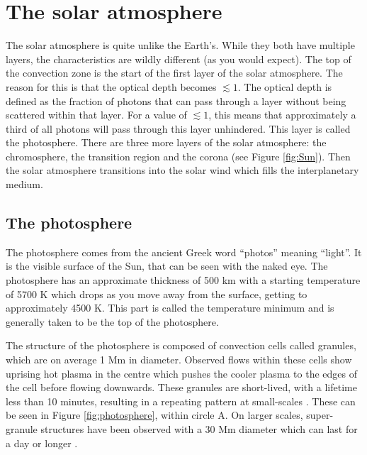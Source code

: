 \section{The solar atmosphere}
 
    The solar atmosphere is quite unlike the Earth's.
    While they both have multiple layers, the characteristics are wildly different (as you would expect). 
    The top of the convection zone is the start of the first layer of the solar atmosphere.
    The reason for this is that the optical depth becomes $\lesssim1$.
    The optical depth is defined as the fraction of photons that can pass through a layer without being scattered within that layer.
    For a value of $\lesssim1$, this means that approximately a third of all photons will pass through this layer unhindered.
    This layer is called the photosphere.
    There are three more layers of the solar atmosphere: the chromosphere, the transition region and the corona (see Figure \ref{fig:Sun}).
    Then the solar atmosphere transitions into the solar wind which fills the interplanetary medium.
    
\subsection{The photosphere}

    The photosphere comes from the ancient Greek word ``photos'' meaning ``light''.
    It is the visible surface of the Sun, that can be seen with the naked eye.
    The photosphere has an approximate thickness of 500 km with a starting temperature of 5700 K which drops as you move away from the surface, getting to approximately 4500 K.
    This part is called the temperature minimum and is generally taken to be the top of the photosphere.

    The structure of the photosphere is composed of convection cells called granules, which are on average 1 Mm in diameter.
    Observed flows within these cells show uprising hot plasma in the centre which pushes the cooler plasma to the edges of the cell before flowing downwards. 
    These granules are short-lived, with a lifetime less than 10 minutes, resulting in a repeating pattern at small-scales \citep{rutten2012solar}.
    These can be seen in Figure \ref{fig:photosphere}, within circle A.
    On larger scales, super-granule structures have been observed with a 30 Mm diameter which can last for a day or longer \citep{lrsp-2010-2}.
   
